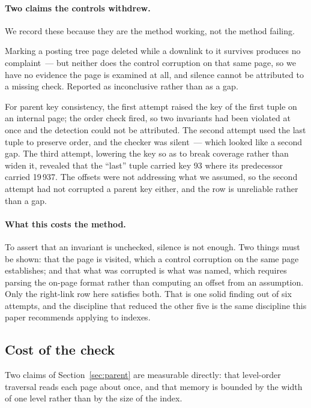 \paragraph{Two claims the controls withdrew.} We record these because they are
the method working, not the method failing.

Marking a posting tree page deleted while a downlink to it survives produces no
complaint~--- but neither does the control corruption on that same page, so we
have no evidence the page is examined at all, and silence cannot be attributed to
a missing check. Reported as inconclusive rather than as a gap.

For parent key consistency, the first attempt raised the key of the first tuple
on an internal page; the order check fired, so two invariants had been violated
at once and the detection could not be attributed. The second attempt used the
last tuple to preserve order, and the checker was silent~--- which looked like a
second gap. The third attempt, lowering the key so as to break coverage rather
than widen it, revealed that the ``last'' tuple carried key 93 where its
predecessor carried 19\,937. The offsets were not addressing what we assumed, so
the second attempt had not corrupted a parent key either, and the row is
unreliable rather than a gap.

\paragraph{What this costs the method.} To assert that an invariant is unchecked,
silence is not enough. Two things must be shown: that the page is visited, which
a control corruption on the same page establishes; and that what was corrupted is
what was named, which requires parsing the on-page format rather than computing
an offset from an assumption. Only the right-link row here satisfies both. That
is one solid finding out of six attempts, and the discipline that reduced the
other five is the same discipline this paper recommends applying to indexes.

\subsection{Cost of the check}

Two claims of Section~\ref{sec:parent} are measurable directly: that level-order
traversal reads each page about once, and that memory is bounded by the width of
one level rather than by the size of the index.

